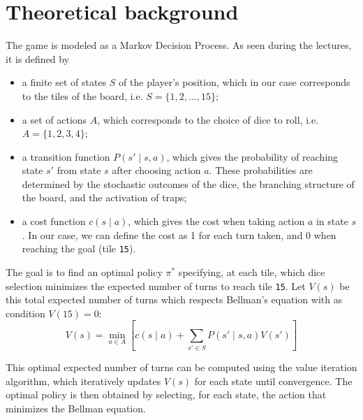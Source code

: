 \documentclass[12pt, twocolumn]{article}
\begin{document}


\section*{Theoretical background}

The game is modeled as a Markov Decision Process. As seen during the lectures, it is defined by \autocite{brandimarte2021shortest}
\begin{itemize}
    \item a finite set of states $S$ of the player's position, which in our case corresponds to the tiles of the board, i.e. $S = \{1, 2, \dots, 15\}$;
    \item a set of actions $A$, which corresponds to the choice of dice to roll, i.e. $A = \{1, 2, 3, 4\}$;
    \item a transition function $P(s' \mid s, a)$, which gives the probability of reaching state $s'$ from state $s$ after choosing action $a$. These probabilities are determined by the stochastic outcomes of the dice, the branching structure of the board, and the activation of traps;
    \item a cost function $c(s \mid a)$, which gives the cost when taking action $a$ in state $s$. In our case, we can define the cost as 1 for each turn taken, and 0 when reaching the goal (tile \texttt{15}).
\end{itemize}

\noindent The goal is to find an optimal policy $\pi^*$ specifying, at each tile, which dice selection minimizes the expected number of turns to reach tile \texttt{15}. Let $V(s)$ be this total expected number of turns which respects Bellman's equation with as condition $V(15)=0$:
\begin{equation*}
    V(s) = \min_{a \in A} \left[ c(s \mid a) + \sum_{s' \in S} P(s' \mid s, a) V(s') \right]
\end{equation*}


\noindent This optimal expected number of turns can be computed using the value iteration algorithm, which iteratively updates $V(s)$ for each state until convergence. The optimal policy is then obtained by selecting, for each state, the action that minimizes the Bellman equation. \\
\end{document}
